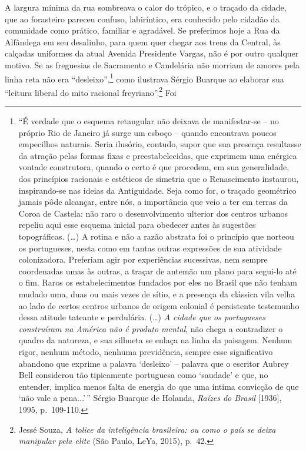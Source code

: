 A largura mínima da rua sombreava o calor do trópico, e o traçado da
cidade, que ao forasteiro pareceu confuso, labiríntico, era conhecido
pelo cidadão da comunidade como prático, familiar e agradável. Se
preferimos hoje a Rua da Alfândega em seu desalinho, para quem quer
chegar aos trens da Central, às calçadas uniformes da atual Avenida
Presidente Vargas, não é por outro qualquer motivo. Se as freguesias de
Sacramento e Candelária não morriam de amores pela linha reta não era
``desleixo'',\footnote{``É verdade que o esquema retangular não deixava
  de manifestar-se -- no próprio Rio de Janeiro já surge um esboço --
  quando encontrava poucos empecilhos naturais. Seria ilusório, contudo,
  supor que sua presença resultasse da atração pelas formas fixas e
  preestabelecidas, que exprimem uma enérgica vontade construtora,
  quando o certo é que procedem, em sua generalidade, dos princípios
  racionais e estéticos de simetria que o Renascimento instaurou,
  inspirando-se nas ideias da Antiguidade. Seja como for, o traçado
  geométrico jamais pôde alcançar, entre nós, a importância que veio a
  ter em terras da Coroa de Castela: não raro o desenvolvimento ulterior
  dos centros urbanos repeliu aqui esse esquema inicial para obedecer
  antes às sugestões topográficas. (\ldots{}) A rotina e não a razão
  abstrata foi o princípio que norteou os portugueses, nesta como em
  tantas outras expressões de sua atividade colonizadora. Preferiam agir
  por experiências sucessivas, nem sempre coordenadas umas às outras, a
  traçar de antemão um plano para segui-lo até o fim. Raros os
  estabelecimentos fundados por eles no Brasil que não tenham mudado
  uma, duas ou mais vezes de sítio, e a presença da clássica vila velha
  ao lado de certos centros urbanos de origem colonial é persistente
  testemunho dessa atitude tateante e perdulária. (\ldots{}) \emph{A
  cidade que os portugueses construíram na América não é produto
  mental}, não chega a contradizer o quadro da natureza, e sua silhueta
  se enlaça na linha da paisagem. Nenhum rigor, nenhum método, nenhuma
  previdência, sempre esse significativo abandono que exprime a palavra
  `desleixo' -- palavra que o escritor Aubrey Bell considerou tão
  tipicamente portuguesa como `saudade' e que, no entender, implica
  menos falta de energia do que uma íntima convicção de que `não vale a
  pena...'\,'' Sérgio Buarque de Holanda, \emph{Raízes do Brasil}
  {[}1936{]}, 1995, p.~109-110.} como ilustrava Sérgio Buarque ao
elaborar sua ``leitura liberal do mito racional freyriano''.\footnote{Jessé
  Souza, \emph{A tolice da inteligência brasileira: ou como o país se
  deixa manipular pela elite} (São Paulo, LeYa, 2015), p.~42.} Foi
